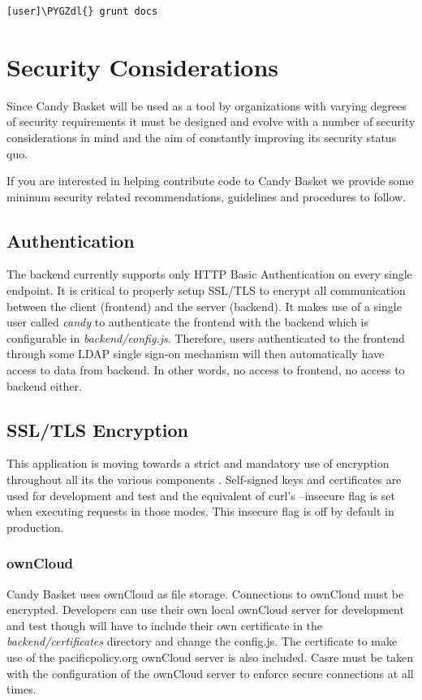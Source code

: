 \documentclass[letterpaper,10pt,english]{sphinxmanual}
\def\PYGZdl{\char`\$}
\begin{document}
\begin{Verbatim}[commandchars=\\\{\}]
[user]\PYGZdl{} grunt docs
\end{Verbatim}


\section{Security Considerations}
\label{developer-guide:security}\label{developer-guide:security-considerations}
Since Candy Basket will be used as a tool by organizations with
varying degrees of security requirements it must be designed and
evolve with a number of security considerations in mind and the aim of
constantly improving its security status quo.

If you are interested in helping contribute code to Candy Basket we
provide some mininum security related recommendations, guidelines and
procedures to follow.


\subsection{Authentication}
\label{developer-guide:authentication}
The backend currently supports only HTTP Basic Authentication on every
single endpoint. It is critical to properly setup SSL/TLS to encrypt
all communication between the client (frontend) and the server
(backend). It makes use of a single user called \emph{candy} to
authenticate the frontend with the backend which is configurable in
\emph{backend/config.js}. Therefore, users authenticated to the frontend
through some LDAP single sign-on mechanism will then automatically
have access to data from backend. In other words, no access to
frontend, no access to backend either.


\subsection{SSL/TLS Encryption}
\label{developer-guide:ssl-tls-encryption}
This application is moving towards a strict and mandatory use of
encryption throughout all its the various components .  Self-signed
keys and certificates are used for development and test and the
equivalent of curl's --insecure flag is set when executing requests in
those modes. This insecure flag is off by default in production.


\subsubsection{ownCloud}
\label{developer-guide:owncloud}
Candy Basket uses ownCloud as file storage. Connections to ownCloud
must be encrypted. Developers can use their own local ownCloud server
for development and test though will have to include their own
certificate in the \emph{backend/certificates} directory and change the
config.js. The certificate to make use of the pacificpolicy.org
ownCloud server is also included. Casre must be taken with the
configuration of the ownCloud server to enforce secure connections at
all times.
\end{document}
